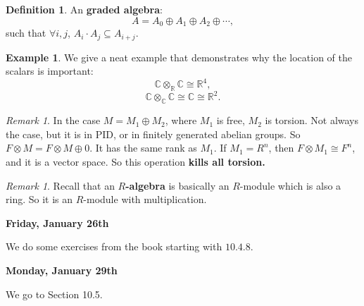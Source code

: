 \documentclass[9pt,reqno,twoside]{amsbook}
\theoremstyle{plain}
\numberwithin{section}{chapter}
\numberwithin{equation}{chapter}
\theoremstyle{definition}
\newtheorem{Def}[theorem]{Definition}
\newtheorem{Ex}[theorem]{Example}
\theoremstyle{remark}
\newtheorem{rem}[theorem]{Remark}
\theoremstyle{plain}
\newcommand{\sub}{\subseteq}
\newcommand{\R}{\mathbb{R}}
\renewcommand{\c}{\mathbb{C}}
\newcommand{\tens}{\otimes}
\begin{document}
\begin{Def}
An \textbf{graded algebra}: 
$$
A = A_0 \oplus A_1 \oplus A_2 \oplus \cdots,
$$
such that $\forall i,j$, $A_i\cdot A_j \sub A_{i + j}$. 
\end{Def}




\begin{Ex}
We give a neat example that demonstrates why the location of the scalars is important: 
$$
\c \tens_\R \c \cong \R^4,
$$
$$
\c \tens_\c \c \cong \c \cong \R^2.
$$
\end{Ex}

\begin{rem}
In the case $M = M_1 \oplus M_2$, where $M_1$ is free, $M_2$ is torsion. Not always the case, but it is in PID, or in finitely generated abelian groups. So $F \tens M = F \tens M \oplus 0$. It has the same rank as $M_1$. If $M_1 = R^n$, then $F \tens M_1 \cong F^n$, and it is a vector space. So this operation \textbf{kills all torsion.}
\end{rem}

\begin{rem}
Recall that an \textbf{$R$-algebra} is basically an $R$-module which is also a ring. So it is an $R$-module with multiplication. 
\end{rem}

\textbf{Friday, January 26th}

We do some exercises from the book starting with $10.4.8$. 

\textbf{Monday, January 29th}

We go to Section 10.5.
\end{document}
